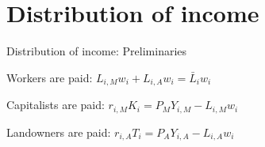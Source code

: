 \documentclass[notes,11pt, aspectratio=169, xcolor=table]{beamer}
\newenvironment{wideitemize}{\itemize\addtolength{\itemsep}{10pt}}{\enditemize}
\begin{document}
\section{Distribution of income}

\begin{frame}{Distribution of income: Preliminaries}

\begin{wideitemize}
    \item Workers are paid: $L_{i,M} w_i + L_{i,A} w_i = \bar{L}_i w_i $
    \item Capitalists are paid: $r_{i,M} K_i = P_M Y_{i,M} - L_{i,M} w_i$
    \item Landowners are paid: $r_{i,A} T_i = P_A Y_{i,A} - L_{i,A} w_i$
\end{wideitemize}
    
\end{frame}
\end{document}
